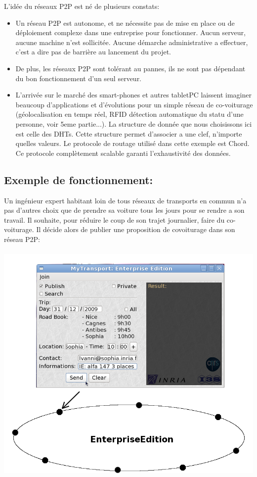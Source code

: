 L'idée du réseaux P2P est né de plusieurs constats: 
\begin{itemize}
\item Un réseau P2P est autonome, et ne nécessite pas de mise en place ou de déploiement complexe dans une entreprise pour fonctionner. Aucun serveur, aucune machine n'est sollicitée. Aucune démarche administrative a effectuer, c'est a dire pas de barrière au lancement du projet.
\item De plus, les réseaux P2P sont tolérant au pannes, ils ne sont pas dépendant du bon fonctionnement d'un seul serveur.
\item L'arrivée sur le marché des smart-phones et autres tabletPC laissent imaginer beaucoup d'applications et d'évolutions pour un simple réseau de co-voiturage (géolocalisation en temps réel, RFID détection automatique du statu d'une personne, voir 5eme partie...).
La structure de donnée que nous choisissons ici est celle des DHTs. Cette structure permet d'associer a une clef, n'importe quelles valeurs. Le protocole de routage utilisé dans cette exemple est Chord. Ce protocole complètement scalable garanti l'exhaustivité des données. \\
\end{itemize}

\clearpage

\subsection{Exemple de fonctionnement: }
Un ingénieur expert habitant loin de tous réseaux de transports en commun n'a pas d'autres choix que de prendre sa voiture tous les jours pour se rendre a son travail. Il souhaite, pour réduire le coup de son trajet journalier, faire du co-voiturage. Il décide alors de publier une proposition de covoiturage dans son réseau P2P:\\

~~~ \includegraphics[scale=0.4]{img/screenshot/enterprisePub}\\

